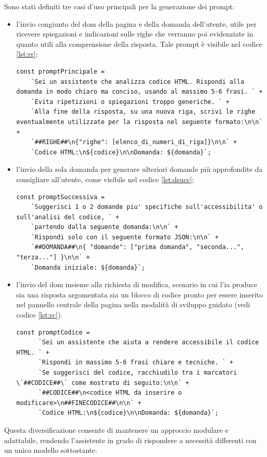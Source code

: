 \noindent Sono stati definiti tre casi d’uso principali per la generazione dei prompt: 
\begin{itemize}
    \item l’invio congiunto del \acrshort{dom} della pagina e della domanda dell’utente, utile per ricevere spiegazioni e indicazioni sulle righe che verranno poi evidenziate in quanto utili alla comprensione della risposta. Tale prompt è visibile nel codice \ref{lst:rr}; 
    \begin{lstlisting}[style=jsStyle, caption={Prompt per la generazione di risposta e righe da evidenziare}, label={lst:rr}]
    const promptPrincipale =
    `Sei un assistente che analizza codice HTML. Rispondi alla domanda in modo chiaro ma conciso, usando al massimo 5-6 frasi. ` +
    `Evita ripetizioni o spiegazioni troppo generiche. ` +
    `Alla fine della risposta, su una nuova riga, scrivi le righe eventualmente utilizzate per la risposta nel seguente formato:\n\n` +
    `##RIGHE##\n{"righe": [elenco_di_numeri_di_riga]}\n\n` +
    `Codice HTML:\n${codice}\n\nDomanda: ${domanda}`;
    \end{lstlisting}
    
    \item l'invio della sola domanda per generare ulteriori domande più approfondite da consigliare all'utente, come visibile nel codice \ref{lst:dsucc};
    \begin{lstlisting}[style=jsStyle, caption={Prompt per la generazione di domande successive}, label={lst:dsucc}]
    const promptSuccessiva =
    `Suggerisci 1 o 2 domande piu' specifiche sull'accessibilita' o sull'analisi del codice, ` +
    `partendo dalla seguente domanda:\n\n` +
    `Rispondi solo con il seguente formato JSON:\n\n` +
    `##DOMANDA##\n{ "domande": ["prima domanda", "seconda...", "terza..."] }\n\n` +
    `Domanda iniziale: ${domanda}`;
    \end{lstlisting}

    
    \item l’invio del \acrshort{dom} insieme alla richiesta di modifica, scenario in cui l’\acrshort{ia} produce sia una risposta argomentata sia un blocco di codice pronto per essere inserito nel pannello centrale della pagina nella modalità di sviluppo guidato (vedi codice \ref{lst:rc}).
    \begin{lstlisting}[style=jsStyle, caption={Prompt per la generazione di risposta e codice \acrshort{html} accessibile}, label={lst:rc}]
    const promptCodice =
      `Sei un assistente che aiuta a rendere accessibile il codice HTML. ` +
      `Rispondi in massimo 5-6 frasi chiare e tecniche. ` +
      `Se suggerisci del codice, racchiudilo tra i marcatori \`##CODICE##\` come mostrato di seguito:\n\n` +
      `##CODICE##\n<codice HTML da inserire o modificare>\n##FINECODICE##\n\n` +
      `Codice HTML:\n${codice}\n\nDomanda: ${domanda}`;
    \end{lstlisting}

\end{itemize}
Questa diversificazione consente di mantenere un approccio modulare e adattabile, rendendo l’assistente in grado di rispondere a necessità differenti con un unico modello sottostante.


